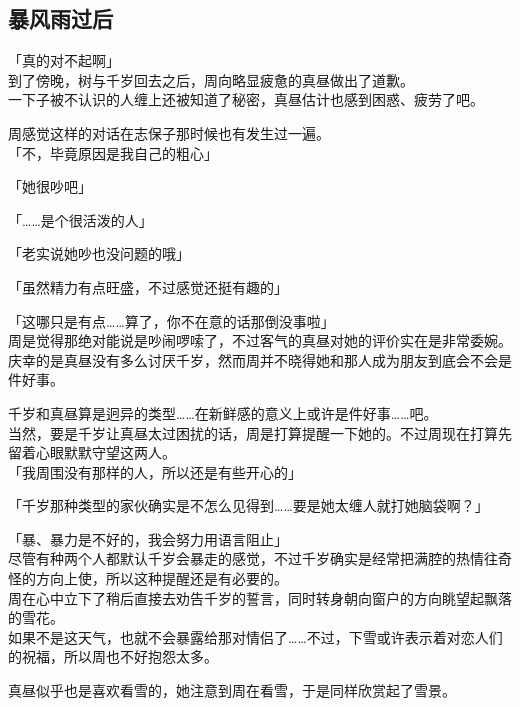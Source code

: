 \subsection{暴风雨过后}

「真的对不起啊」\\

到了傍晚，树与千岁回去之后，周向略显疲惫的真昼做出了道歉。\\

一下子被不认识的人缠上还被知道了秘密，真昼估计也感到困惑、疲劳了吧。

周感觉这样的对话在志保子那时候也有发生过一遍。\\

「不，毕竟原因是我自己的粗心」

「她很吵吧」

「……是个很活泼的人」

「老实说她吵也没问题的哦」

「虽然精力有点旺盛，不过感觉还挺有趣的」

「这哪只是有点……算了，你不在意的话那倒没事啦」\\

周是觉得那绝对能说是吵闹啰嗦了，不过客气的真昼对她的评价实在是非常委婉。\\

庆幸的是真昼没有多么讨厌千岁，然而周并不晓得她和那人成为朋友到底会不会是件好事。

千岁和真昼算是迥异的类型……在新鲜感的意义上或许是件好事……吧。\\

当然，要是千岁让真昼太过困扰的话，周是打算提醒一下她的。不过周现在打算先留着心眼默默守望这两人。\\

「我周围没有那样的人，所以还是有些开心的」

「千岁那种类型的家伙确实是不怎么见得到……要是她太缠人就打她脑袋啊？」

「暴、暴力是不好的，我会努力用语言阻止」\\

尽管有种两个人都默认千岁会暴走的感觉，不过千岁确实是经常把满腔的热情往奇怪的方向上使，所以这种提醒还是有必要的。\\

周在心中立下了稍后直接去劝告千岁的誓言，同时转身朝向窗户的方向眺望起飘落的雪花。\\

如果不是这天气，也就不会暴露给那对情侣了……不过，下雪或许表示着对恋人们的祝福，所以周也不好抱怨太多。

真昼似乎也是喜欢看雪的，她注意到周在看雪，于是同样欣赏起了雪景。\\

